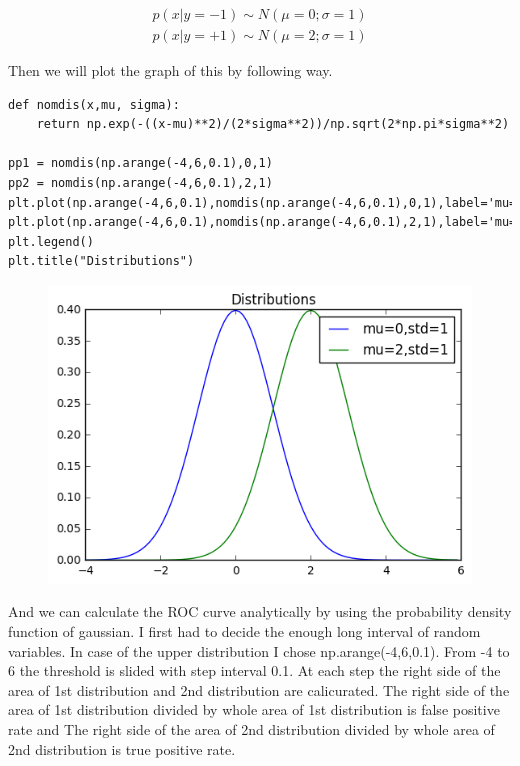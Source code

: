 \documentclass[a4paper,11pt]{article}
\begin{document}
\begin{eqnarray*}
p(x|y = -1) \sim N(\mu = 0; \sigma = 1) \\
p(x|y = +1) \sim N(\mu = 2; \sigma = 1)
\end{eqnarray*}

Then we will plot the graph of this by following way.

\begin{verbatim}
def nomdis(x,mu, sigma):
    return np.exp(-((x-mu)**2)/(2*sigma**2))/np.sqrt(2*np.pi*sigma**2)
    
pp1 = nomdis(np.arange(-4,6,0.1),0,1)
pp2 = nomdis(np.arange(-4,6,0.1),2,1)
plt.plot(np.arange(-4,6,0.1),nomdis(np.arange(-4,6,0.1),0,1),label='mu=0,std=1')
plt.plot(np.arange(-4,6,0.1),nomdis(np.arange(-4,6,0.1),2,1),label='mu=2,std=1')
plt.legend()
plt.title("Distributions")
\end{verbatim}

\begin{figure}[htbp]
  \includegraphics[scale=0.7]{histmix.png}
\end{figure}

And we can calculate the ROC curve analytically by using the probability density function of gaussian. I first had to decide the enough long interval of random variables. In case of the upper distribution I chose np.arange(-4,6,0.1). From -4 to 6 the threshold is slided with step interval 0.1. At each step the right side of the area of 1st distribution and 2nd distribution are calicurated. The right side of the area of 1st distribution divided by whole area of 1st distribution is false positive rate and The right side of the area of 2nd distribution divided by whole area of 2nd distribution is true positive rate.
\end{document}
